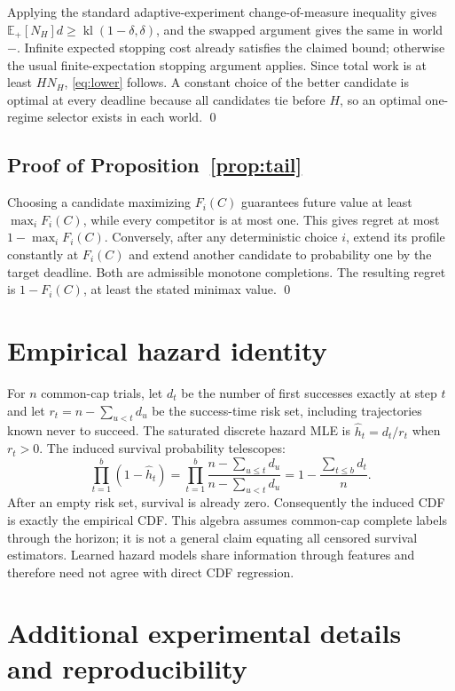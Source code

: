 \documentclass[11pt]{article}
\theoremstyle{definition}\newtheorem{definition}[theorem]{Definition}
\newcommand{\E}{\mathbb{E}}
\newcommand{\kl}{\operatorname{kl}}
\begin{document}
Applying the standard adaptive-experiment change-of-measure inequality \citep[ Lemma 1]{kaufmann2016} gives $\E_+[N_H]d\ge\kl(1-\delta,\delta)$, and the swapped argument gives the same in world $-$. Infinite expected stopping cost already satisfies the claimed bound; otherwise the usual finite-expectation stopping argument applies. Since total work is at least $HN_H$, \eqref{eq:lower} follows. A constant choice of the better candidate is optimal at every deadline because all candidates tie before $H$, so an optimal one-regime selector exists in each world. \qed

\subsection{Proof of Proposition~\ref{prop:tail}}
Choosing a candidate maximizing $F_i(C)$ guarantees future value at least $\max_iF_i(C)$, while every competitor is at most one. This gives regret at most $1-\max_iF_i(C)$. Conversely, after any deterministic choice $i$, extend its profile constantly at $F_i(C)$ and extend another candidate to probability one by the target deadline. Both are admissible monotone completions. The resulting regret is $1-F_i(C)$, at least the stated minimax value. \qed

\section{Empirical hazard identity}\label{app:hazard}
For $n$ common-cap trials, let $d_t$ be the number of first successes exactly at step $t$ and let $r_t=n-\sum_{u<t}d_u$ be the success-time risk set, including trajectories known never to succeed. The saturated discrete hazard MLE is $\widehat h_t=d_t/r_t$ when $r_t>0$. The induced survival probability telescopes:
\[
 \prod_{t=1}^b(1-\widehat h_t)
 =\prod_{t=1}^b\frac{n-\sum_{u\le t}d_u}{n-\sum_{u<t}d_u}
 =1-\frac{\sum_{t\le b}d_t}{n}.
\]
After an empty risk set, survival is already zero. Consequently the induced CDF is exactly the empirical CDF. This algebra assumes common-cap complete labels through the horizon; it is not a general claim equating all censored survival estimators. Learned hazard models share information through features and therefore need not agree with direct CDF regression.

\section{Additional experimental details and reproducibility}
\end{document}
